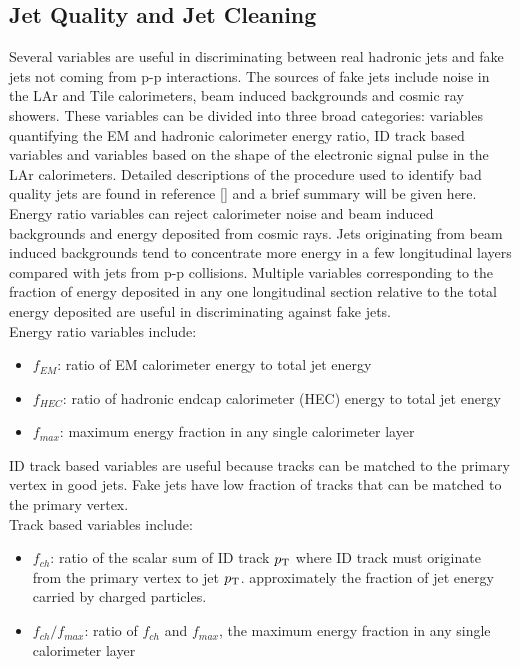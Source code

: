 \subsection{Jet Quality and Jet Cleaning}
\label{sec:jet:quality}

\indent Several variables are useful in discriminating between real hadronic jets and fake jets not coming from p-p interactions.  The sources of fake jets include noise in the LAr and Tile calorimeters, beam induced backgrounds and cosmic ray showers.  These variables can be divided into three broad categories: variables quantifying the EM and hadronic calorimeter energy ratio, ID track based variables and variables based on the shape of the electronic signal pulse in the LAr calorimeters.  Detailed descriptions of the procedure used to identify bad quality jets are found in reference [\cite{JetCleaning}] and a brief summary will be given here.\\

\indent Energy ratio variables can reject calorimeter noise and beam induced backgrounds and energy deposited from cosmic rays.  Jets originating from beam induced backgrounds tend to concentrate more energy in a few longitudinal layers compared with jets from p-p collisions.  Multiple variables corresponding to the fraction of energy deposited in any one longitudinal section relative to the total energy deposited are useful in discriminating against fake jets. \\

\indent Energy ratio variables include: \\

\begin{itemize}
\item[] $f_{EM}$: ratio of EM calorimeter energy to total jet energy
\item[] $f_{HEC}$: ratio of hadronic endcap calorimeter (HEC) energy to total jet energy
\item[] $f_{max}$: maximum energy fraction in any single calorimeter layer
\end{itemize}

\indent ID track based variables are useful because tracks can be matched to the primary vertex in good jets.  Fake jets have low fraction of tracks that can be matched to the primary vertex.  \\

\indent Track based variables include: \\

\begin{itemize}
\item[] $f_{ch}$: ratio of the scalar sum of ID track $p_{\mathrm{T}}$ where ID track must originate from the primary vertex to jet $p_{\mathrm{T}}$.  approximately the fraction of jet energy carried by charged particles.  
\item[] $f_{ch}/f_{max}$: ratio of $f_{ch}$ and $f_{max}$, the maximum energy fraction in any single calorimeter layer
\end{itemize}

